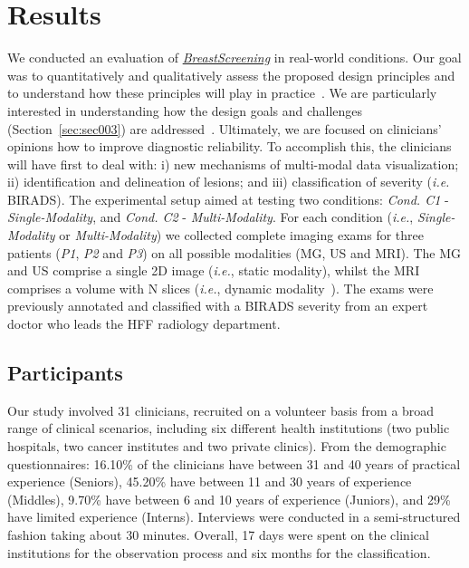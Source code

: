 \section{Results}
\label{sec:sec005}

We conducted an evaluation of \href{https://breastscreening.github.io/}{{\it BreastScreening}} in real-world conditions.
Our goal was to quantitatively and qualitatively assess the proposed design principles and to understand how these principles will play in practice~\cite{10.1145/3027063.3027103}.
We are particularly interested in understanding how
the design goals and challenges (Section~\ref{sec:sec003}) are addressed~\cite{Veeraraghavan2018}.
Ultimately, we are focused on clinicians' opinions how to improve diagnostic reliability.
To accomplish this, the clinicians will have first to deal with:
i) new mechanisms of multi-modal data visualization;
ii) identification and delineation of lesions; and
iii) classification of severity ({\em i.e.} BIRADS).
The experimental setup aimed at testing two conditions:
\textit{Cond. C1} - \textit{Single-Modality}, and
\textit{Cond. C2} - \textit{Multi-Modality}.
For each condition ({\it i.e.}, {\it Single-Modality} or {\it Multi-Modality}) we collected complete imaging exams for three patients (\textit{P1}, \textit{P2} and \textit{P3}) on all possible modalities (MG, US and MRI).
The MG and US comprise a single 2D image ({\em i.e.}, static modality), whilst the MRI~\cite{8759179, SANTIAGO20189} comprises a volume with N slices ({\em i.e.}, dynamic modality~\cite{8296581}).
The exams were previously annotated and classified with a BIRADS severity from an expert doctor who leads the HFF radiology department.

\subsection{Participants}

Our study involved 31 clinicians, recruited on a volunteer basis from a broad range of clinical scenarios, including six different health institutions (two public hospitals, two cancer institutes and two private clinics).
From the demographic questionnaires: 16.10\% of the clinicians have between 31 and 40 years of practical experience (Seniors), 45.20\% have between 11 and 30 years of experience (Middles), 9.70\% have between 6 and 10 years of experience (Juniors), and 29\% have limited experience (Interns).
Interviews were conducted in a semi-structured fashion taking about 30 minutes.
Overall, 17 days were spent on the clinical institutions for the observation process and six months for the classification.

